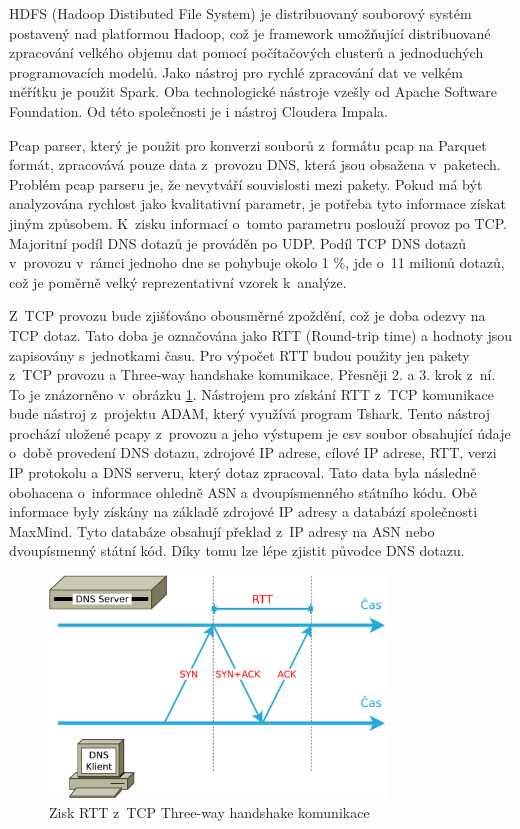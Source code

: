 \documentclass[thesis=M,czech]{src/FITthesis}[2019/12/23]
\begin{document}
HDFS (Hadoop Distibuted File System) je distribuovaný souborový systém postavený nad platformou Hadoop, což je framework umožňující distribuované zpracování velkého objemu dat pomocí počítačových clusterů a jednoduchých programovacích modelů. Jako nástroj pro rychlé zpracování dat ve velkém měřítku je použit Spark. Oba technologické nástroje  vzešly od Apache Software Foundation. Od této společnosti je i nástroj Cloudera Impala. \cite{hadoop-spark} 


Pcap parser, který je použit pro konverzi souborů z~formátu pcap na Parquet formát, zpracovává pouze data z~provozu DNS, která jsou obsažena v~paketech. Problém pcap parseru je, že nevytváří souvislosti mezi pakety. Pokud má být analyzována rychlost jako kvalitativní parametr, je potřeba tyto informace získat jiným způsobem. K~zisku informací o~tomto parametru poslouží provoz po TCP. Majoritní podíl DNS dotazů je prováděn po UDP. Podíl TCP DNS dotazů v~provozu v~rámci jednoho dne se pohybuje okolo 1 \%, jde o~11 milionů dotazů, což je poměrně velký reprezentativní vzorek k~analýze.   

Z~TCP provozu bude zjišťováno obousměrné zpoždění, což je doba odezvy na TCP dotaz. Tato doba je označována jako RTT (Round-trip time) a hodnoty jsou zapisovány s~jednotkami času. Pro výpočet RTT budou použity jen pakety z~TCP provozu a Three-way handshake komunikace. Přesněji 2. a 3. krok z~ní. To je znázorněno v~obrázku \ref{fig:rttTCP}. Nástrojem pro získání RTT z~TCP komunikace bude nástroj z~projektu ADAM, který využívá program Tshark. Tento nástroj prochází uložené pcapy z~provozu a jeho výstupem je csv soubor obsahující údaje o~době provedení DNS dotazu, zdrojové IP adrese, cílové IP adrese, RTT, verzi IP protokolu a DNS serveru, který dotaz zpracoval. Tato data byla následně obohacena o~informace ohledně ASN a dvoupísmenného státního kódu. Obě informace byly získány na základě zdrojové IP adresy a databází společnosti MaxMind. Tyto databáze obsahují překlad z~IP adresy na ASN nebo dvoupísmenný státní kód. Díky tomu lze lépe zjistit původce DNS dotazu. 

\begin{figure}[ht]
  \centering
   \includegraphics[width=0.8\textwidth]{images/rtt_tcp.pdf}
   \caption{Zisk RTT z~TCP Three-way handshake komunikace }
     \label{fig:rttTCP}
\end{figure}
\end{document}

